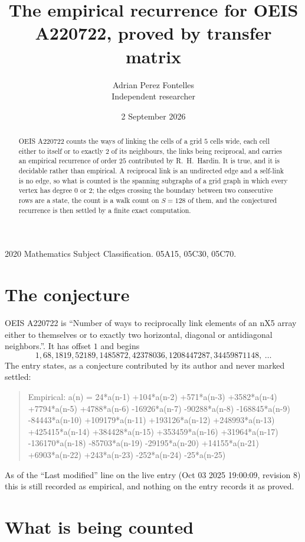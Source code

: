 \documentclass[11pt,a4paper]{article}
\title{The empirical recurrence for OEIS A220722, proved by transfer matrix}
\author{Adrian Perez Fontelles\\ \small Independent researcher}
\date{2 September 2026}
\theoremstyle{plain}
\theoremstyle{definition}
\begin{document}
\maketitle

\begin{abstract}
OEIS A220722 counts the ways of linking the cells of a grid $5$ cells wide, each cell either to
itself or to exactly $2$ of its neighbours, the links being reciprocal, and carries an
empirical recurrence of order $25$ contributed by R.~H.~Hardin. It is true, and it is
decidable rather than empirical. A reciprocal link is an undirected edge and a self-link is
no edge, so what is counted is the spanning subgraphs of a grid graph in which every vertex
has degree $0$ or $2$; the edges crossing the boundary between two consecutive rows are a
state, the count is a walk count on $S=128$ of them, and the conjectured recurrence is then
settled by a finite exact computation.
\end{abstract}

\noindent\small 2020 Mathematics Subject Classification. 05A15, 05C30, 05C70.\normalsize

\section{The conjecture}

OEIS A220722 is ``Number of ways to reciprocally link elements of an nX5 array either to themselves or to exactly two horizontal, diagonal or antidiagonal neighbors.''. It has offset $1$ and begins
\[
1, 68, 1819, 52189, 1485872, 42378036, 1208447287, 34459871148,\ \dots
\]
The entry states, as a conjecture contributed by its author and never marked settled:
\begin{quote}
Empirical: a(n) = 24*a(n-1) +104*a(n-2) +571*a(n-3) +3582*a(n-4) +7794*a(n-5) +4788*a(n-6) -16926*a(n-7) -90288*a(n-8) -168845*a(n-9) -84443*a(n-10) +109179*a(n-11) +193126*a(n-12) +248993*a(n-13) +425415*a(n-14) +384428*a(n-15) +353459*a(n-16) +31964*a(n-17) -136170*a(n-18) -85703*a(n-19) -29195*a(n-20) +14155*a(n-21) +6903*a(n-22) +243*a(n-23) -252*a(n-24) -25*a(n-25)
\end{quote}
As of the ``Last modified'' line on the live entry (Oct 03 2025 19:00:09, revision 8) this is still
recorded as empirical, and nothing on the entry records it as proved.

\section{What is being counted}
\end{document}
